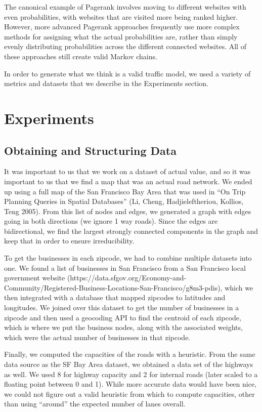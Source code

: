 \documentclass{article}
\begin{document}
The canonical example of Pagerank involves moving to different websites with even probabilities, with websites that are visited more being ranked higher. However, more advanced Pagerank approaches frequently use more complex methods for assigning what the actual probabilities are, rather than simply evenly distributing probabilities across the different connected websites. All of these approaches still create valid Markov chains. 

In order to generate what we think is a valid traffic model, we used a variety of metrics and datasets that we describe in the Experiments section.
\section{Experiments}
\subsection{Obtaining and Structuring Data}
It was important to us that we work on a dataset of actual value, and so it was important to us that we find a map that was an actual road network. We ended up using a full map of the San Francisco Bay Area that was used in ``On Trip Planning Queries in Spatial Databases'' (Li, Cheng, Hadjieleftheriou, Kollios, Teng 2005). From this list of nodes and edges, we generated a graph with edges going in both directions (we ignore 1 way roads). Since the edges are bidirectional, we find the largest strongly connected components in the graph and keep that in order to ensure irreducibility.

To get the businesses in each zipcode, we had to combine multiple datasets into one. We found a list of businesses in San Francisco from a San Francisco local government website (https://data.sfgov.org/Economy-and-Community/Registered-Business-Locations-San-Francisco/g8m3-pdis), which we then integrated with a database that mapped zipcodes to latitudes and longitudes. We joined over this dataset to get the number of businesses in a zipcode and then used a geocoding API to find the centroid of each zipcode, which is where we put the business nodes, along with the associated weights, which were the actual number of businesses in that zipcode.

Finally, we computed the capacities of the roads with a heuristic. From the same data source as the SF Bay Area dataset, we obtained a data set of the highways as well. We used 8 for highway capacity and 2 for internal roads (later scaled to a floating point between 0 and 1). While more accurate data would have been nice, we could not figure out a valid heuristic from which to compute capacities, other than using ``around'' the expected number of lanes overall.
\end{document}
